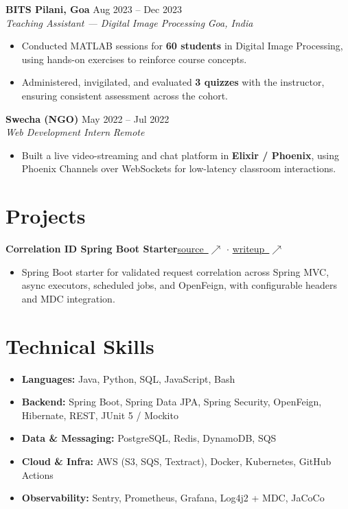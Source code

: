 \documentclass[10pt]{article}
\newcommand{\entry}[4]{\textbf{#1} \hfill #3 \\ \textit{#2} \hfill \textit{#4}\vspace{1pt}}
\newcommand{\proj}[2]{\vspace{2pt}\textbf{#1}\hfill #2\par\vspace{-2pt}}
\newcommand{\writeup}[1]{{\footnotesize\href{#1}{writeup~$\nearrow$}}}
\newcommand{\source}[1]{{\footnotesize\href{#1}{source~$\nearrow$}}}
\newenvironment{bullets}{\begin{itemize}[leftmargin=12pt,itemsep=1.5pt,topsep=1pt,parsep=0pt]}{\end{itemize}}
\begin{document}
\vspace{3pt}
\entry{BITS Pilani, Goa}{Teaching Assistant --- Digital Image Processing}{Aug 2023 -- Dec 2023}{Goa, India}
\begin{bullets}
  \item Conducted MATLAB sessions for \textbf{60 students} in Digital Image Processing, using hands-on exercises to reinforce course concepts.
  \item Administered, invigilated, and evaluated \textbf{3 quizzes} with the instructor, ensuring consistent assessment across the cohort.
\end{bullets}

\vspace{3pt}
\entry{Swecha (NGO)}{Web Development Intern}{May 2022 -- Jul 2022}{Remote}
\begin{bullets}
  \item Built a live video-streaming and chat platform in \textbf{Elixir / Phoenix}, using Phoenix Channels over WebSockets for low-latency classroom interactions.
\end{bullets}

\section{Projects}
\proj{Correlation ID Spring Boot Starter}{\source{https://github.com/AayushMiglani/correlation-id-spring-boot} $\cdot$ \writeup{https://aayushmiglani.github.io/posts/correlation-id-spring-boot/}}
\begin{bullets}
  \item Spring Boot starter for validated request correlation across Spring MVC, async executors, scheduled jobs, and OpenFeign, with configurable headers and MDC integration.
\end{bullets}

\section{Technical Skills}
\begin{bullets}
  \item \textbf{Languages:} Java, Python, SQL, JavaScript, Bash
  \item \textbf{Backend:} Spring Boot, Spring Data JPA, Spring Security, OpenFeign, Hibernate, REST, JUnit 5 / Mockito
  \item \textbf{Data \& Messaging:} PostgreSQL, Redis, DynamoDB, SQS
  \item \textbf{Cloud \& Infra:} AWS (S3, SQS, Textract), Docker, Kubernetes, GitHub Actions
  \item \textbf{Observability:} Sentry, Prometheus, Grafana, Log4j2 + MDC, JaCoCo
\end{bullets}
\end{document}
